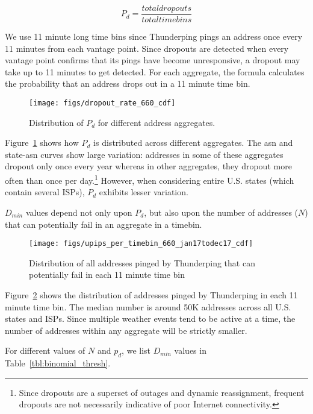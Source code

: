 \begin{equation}
P_d= \frac{total dropouts}{total time bins}
\label{eq:p_dropout}
\end{equation}

We use 11 minute long time bins since Thunderping pings an address
once every 11 minutes from each vantage point. Since dropouts are
detected when every vantage point confirms that its pings have become
unresponsive, a dropout may take up to 11 minutes to get detected. For
each aggregate, the formula calculates the probability that an address
drops out in a 11 minute time bin.

\begin{figure}[t]
\centering
\texttt{[image: figs/dropout\_rate\_660\_cdf]}
\caption{
\label{fig:p_dropout}
Distribution of $P_d$ for different address aggregates. }
\end{figure}

Figure~\ref{fig:p_dropout} shows how $P_d$ is distributed across
different aggregates. The asn and state-asn curves show large
variation: addresses in some of these aggregates dropout only once every
year whereas in other aggregates, they dropout more often than once per
day.\footnote{Since dropouts are a superset of outages and dynamic
  reassignment, frequent dropouts are not necessarily indicative of
  poor Internet connectivity.} However, when considering entire U.S. states (which contain
several ISPs), $P_d$ exhibits lesser variation. 

$D_{min}$ values depend not only upon $P_d$, but also upon the number
of addresses ($N$) that can potentially fail in an aggregate in a
timebin. 

\begin{figure}[t]
\centering
\texttt{[image: figs/upips\_per\_timebin\_660\_jan17todec17\_cdf]}
\caption{
\label{fig:upips_per_timebin}
Distribution of all addresses pinged by Thunderping that can potentially fail in each 11 minute
time bin}
\end{figure}

Figure~\ref{fig:upips_per_timebin} shows the distribution of addresses
pinged by Thunderping in each 11 minute time bin. The median number is
around 50K addresses across all U.S. states and ISPs. Since multiple
weather events tend to be active at a time, the number of addresses
within any aggregate will be strictly smaller. 

For different values of $N$ and $p_d$, we list $D_{min}$ values in
Table~\ref{tbl:binomial_thresh}. 

